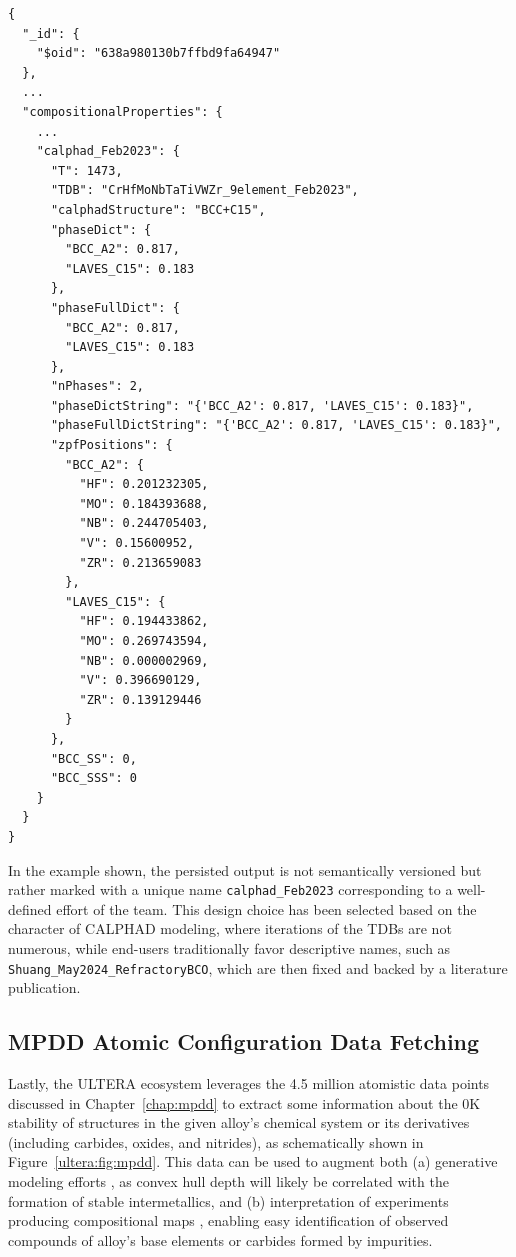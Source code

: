 \begin{verbatim}
{
  "_id": {
    "$oid": "638a980130b7ffbd9fa64947"
  },
  ...
  "compositionalProperties": {
    ...
    "calphad_Feb2023": {
      "T": 1473,
      "TDB": "CrHfMoNbTaTiVWZr_9element_Feb2023",
      "calphadStructure": "BCC+C15",
      "phaseDict": {
        "BCC_A2": 0.817,
        "LAVES_C15": 0.183
      },
      "phaseFullDict": {
        "BCC_A2": 0.817,
        "LAVES_C15": 0.183
      },
      "nPhases": 2,
      "phaseDictString": "{'BCC_A2': 0.817, 'LAVES_C15': 0.183}",
      "phaseFullDictString": "{'BCC_A2': 0.817, 'LAVES_C15': 0.183}",
      "zpfPositions": {
        "BCC_A2": {
          "HF": 0.201232305,
          "MO": 0.184393688,
          "NB": 0.244705403,
          "V": 0.15600952,
          "ZR": 0.213659083
        },
        "LAVES_C15": {
          "HF": 0.194433862,
          "MO": 0.269743594,
          "NB": 0.000002969,
          "V": 0.396690129,
          "ZR": 0.139129446
        }
      },
      "BCC_SS": 0,
      "BCC_SSS": 0
    }
  }
}
\end{verbatim}

In the example shown, the persisted output is not semantically versioned but rather marked with a unique name \texttt{calphad\_Feb2023} corresponding to a well-defined effort of the team. This design choice has been selected based on the character of CALPHAD modeling, where iterations of the TDBs are not numerous, while end-users traditionally favor descriptive names, such as \texttt{Shuang\_May2024\_RefractoryBCO}, which are then fixed and backed by a literature publication.


\subsection{MPDD Atomic Configuration Data Fetching} \label{ultera:ssec:mpdd}

Lastly, the ULTERA ecosystem leverages the 4.5 million atomistic data points discussed in Chapter~\ref{chap:mpdd} to extract some information about the 0K stability of structures in the given alloy's chemical system or its derivatives (including carbides, oxides, and nitrides), as schematically shown in Figure~\ref{ultera:fig:mpdd}. This data can be used to augment both (a) generative modeling efforts \cite{Debnath2021GenerativeAlloys}, as convex hull depth will likely be correlated with the formation of stable intermetallics, and (b) interpretation of experiments producing compositional maps \cite{Li2024DesignExperiments}, enabling easy identification of observed compounds of alloy's base elements or carbides formed by impurities. 

